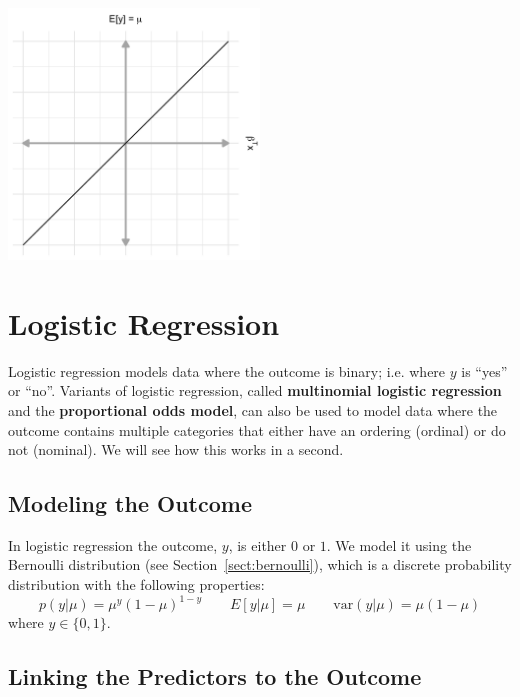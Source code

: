 \begin{center}
\includegraphics[width=0.5\textwidth]{img/l02-figure1-linreg.png}
\end{center}


\section{Logistic Regression}

Logistic regression models data where the outcome is binary; i.e. where $y$ is ``yes'' or ``no''. Variants of logistic regression, called \textbf{multinomial logistic regression} and the \textbf{proportional odds model}, can also be used to model data where the outcome contains multiple categories that either have an ordering (ordinal) or do not (nominal). We will see how this works in a second.

\subsection{Modeling the Outcome}

In logistic regression the outcome, $y$, is either $0$ or $1$. We model it using the Bernoulli distribution (see Section~\ref{sect:bernoulli}), which is a discrete probability distribution with the following properties:
$$ p(y|\mu) = \mu^y (1 - \mu) ^ {1-y} \qquad E[y| \mu] = \mu \qquad \text{var}(y | \mu) = \mu (1 - \mu) $$
where $y \in \{0, 1\}$.

\subsection{Linking the Predictors to the Outcome}


